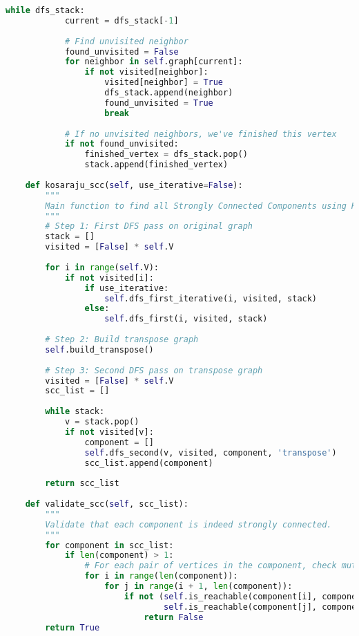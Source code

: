 \documentclass{book}
\theoremstyle{definition}
\begin{document}
\begin{lstlisting}[language=Python, caption=Graph Class Structure]
        while dfs_stack:
            current = dfs_stack[-1]
            
            # Find unvisited neighbor
            found_unvisited = False
            for neighbor in self.graph[current]:
                if not visited[neighbor]:
                    visited[neighbor] = True
                    dfs_stack.append(neighbor)
                    found_unvisited = True
                    break
            
            # If no unvisited neighbors, we've finished this vertex
            if not found_unvisited:
                finished_vertex = dfs_stack.pop()
                stack.append(finished_vertex)
    
    def kosaraju_scc(self, use_iterative=False):
        """
        Main function to find all Strongly Connected Components using Kosaraju's algorithm.
        """
        # Step 1: First DFS pass on original graph
        stack = []
        visited = [False] * self.V
        
        for i in range(self.V):
            if not visited[i]:
                if use_iterative:
                    self.dfs_first_iterative(i, visited, stack)
                else:
                    self.dfs_first(i, visited, stack)
        
        # Step 2: Build transpose graph
        self.build_transpose()
        
        # Step 3: Second DFS pass on transpose graph
        visited = [False] * self.V
        scc_list = []
        
        while stack:
            v = stack.pop()
            if not visited[v]:
                component = []
                self.dfs_second(v, visited, component, 'transpose')
                scc_list.append(component)
        
        return scc_list
    
    def validate_scc(self, scc_list):
        """
        Validate that each component is indeed strongly connected.
        """
        for component in scc_list:
            if len(component) > 1:
                # For each pair of vertices in the component, check mutual reachability
                for i in range(len(component)):
                    for j in range(i + 1, len(component)):
                        if not (self.is_reachable(component[i], component[j]) and 
                                self.is_reachable(component[j], component[i])):
                            return False
        return True
    

\end{lstlisting}
\end{document}
